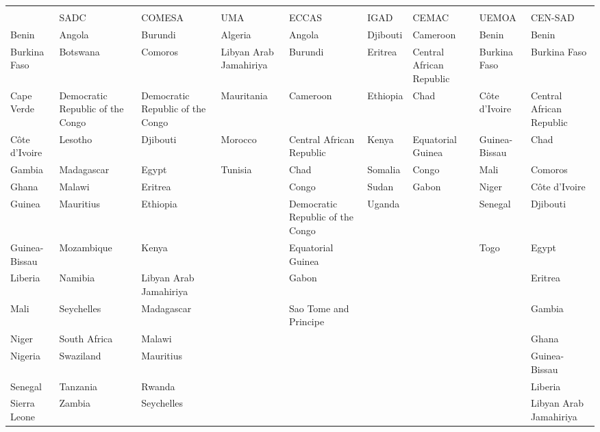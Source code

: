 \begin{longtable}{p{1.75cm}p{1.75cm}p{1.75cm}p{1.75cm}p{1.75cm}p{1.75cm}p{1.75cm}p{1.75cm}p{1.75cm}}
  \toprule
 \rowcolor{@tableheadcolor}\multicolumn{9}{H}{\color{white}RAF regional economic communities}\\
 \hhline{%
>{\arrayrulecolor{white}}---------%
}
 \rowcolor{@tableheadcolor} \multicolumn{1}{H}{\color{white}ECOWAS}&\multicolumn{1}{H}{\color{white}SADC}&\multicolumn{1}{H}{\color{white}COMESA}&\multicolumn{1}{H}{\color{white}UMA}&\multicolumn{1}{H}{\color{white}ECCAS}&\multicolumn{1}{H}{\color{white}IGAD}&\multicolumn{1}{H}{\color{white}CEMAC}&\multicolumn{1}{H}{\color{white}UEMOA}&\multicolumn{1}{H}{\color{white}CEN-SAD} \\
 \midrule Benin & Angola & Burundi & Algeria & Angola & Djibouti & Cameroon & Benin &  Benin\\ 
  Burkina Faso & Botswana & Comoros & Libyan Arab Jamahiriya & Burundi & Eritrea & Central African Republic & Burkina Faso & Burkina Faso\\ 
  Cape Verde & Democratic Republic of the Congo & Democratic Republic of the Congo & Mauritania & Cameroon & Ethiopia & Chad & Côte d'Ivoire & Central African Republic\\ 
  Côte d'Ivoire & Lesotho & Djibouti & Morocco & Central African Republic & Kenya & Equatorial Guinea & Guinea-Bissau & Chad\\ 
  Gambia & Madagascar & Egypt & Tunisia & Chad & Somalia & Congo & Mali & Comoros\\ 
  Ghana & Malawi & Eritrea &  & Congo & Sudan & Gabon & Niger & Côte d'Ivoire\\ 
  Guinea & Mauritius & Ethiopia &  & Democratic Republic of the Congo & Uganda &  & Senegal & Djibouti\\ 
  Guinea-Bissau & Mozambique & Kenya &  & Equatorial Guinea &  &  & Togo & Egypt\\ 
  Liberia & Namibia & Libyan Arab Jamahiriya &  & Gabon &  &  &  & Eritrea\\ 
  Mali & Seychelles & Madagascar &  & Sao Tome and Principe &  &  &  & Gambia\\ 
  Niger & South Africa & Malawi &  &  &  &  &  & Ghana\\ 
  Nigeria & Swaziland & Mauritius &  &  &  &  &  & Guinea-Bissau\\ 
  Senegal & Tanzania & Rwanda &  &  &  &  &  & Liberia\\ 
  Sierra Leone & Zambia & Seychelles &  &  &  &  &  & Libyan Arab Jamahiriya\\ 

\end{longtable}
